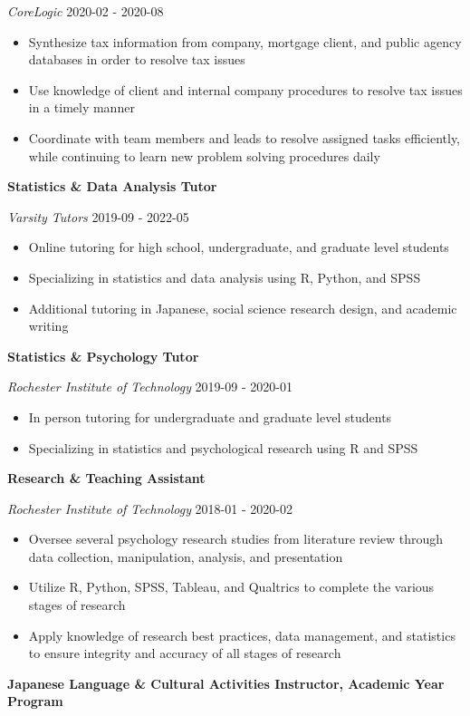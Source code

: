 \documentclass[a4paper,9pt]{extarticle}
\begin{document}
\noindent\textit{CoreLogic} \hfill 2020-02 - 2020-08
\begin{itemize}\item Synthesize tax information from company, mortgage client, and public agency databases in order to resolve tax issues
\item Use knowledge of client and internal company procedures to resolve tax issues in a timely manner
\item Coordinate with team members and leads to resolve assigned tasks efficiently, while continuing to learn new problem solving procedures daily
\end{itemize}
\noindent\textbf{Statistics \& Data Analysis Tutor} 

\noindent\textit{Varsity Tutors} \hfill 2019-09 - 2022-05
\begin{itemize}\item Online tutoring for high school, undergraduate, and graduate level students
\item Specializing in statistics and data analysis using R, Python, and SPSS
\item Additional tutoring in Japanese, social science research design, and academic writing
\end{itemize}
\noindent\textbf{Statistics \& Psychology Tutor} 

\noindent\textit{Rochester Institute of Technology} \hfill 2019-09 - 2020-01
\begin{itemize}\item In person tutoring for undergraduate and graduate level students
\item Specializing in statistics and psychological research using R and SPSS
\end{itemize}
\noindent\textbf{Research \& Teaching Assistant} 

\noindent\textit{Rochester Institute of Technology} \hfill 2018-01 - 2020-02
\begin{itemize}\item Oversee several psychology research studies from literature review through data collection, manipulation, analysis, and presentation
\item Utilize R, Python, SPSS, Tableau, and Qualtrics to complete the various stages of research
\item Apply knowledge of research best practices, data management, and statistics to ensure integrity and accuracy of all stages of research
\end{itemize}
\noindent\textbf{Japanese Language \& Cultural Activities Instructor, Academic Year Program} 
\end{document}
